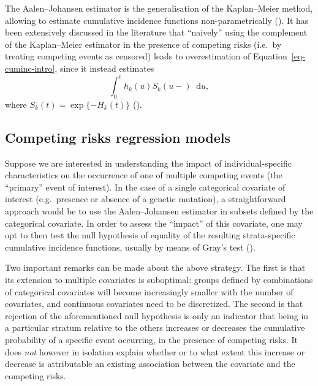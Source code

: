 \documentclass[
  letterpaper,
  paper=240mm:170mm,
  twoside=true,
  open=right,
  fontsize=10pt,
  pagesize=false,
  BCOR=15mm,
  DIV=14,
  headinclude=true,
  footinclude=false,
  headsepline=on]{scrbook}
\newcommand\diff{\mathop{}\!\mathrm{d}}
\begin{document}
The Aalen--Johansen estimator is the generalisation of the Kaplan--Meier
method, allowing to estimate cumulative incidence functions
non-parametrically
(). It has been extensively discussed in the literature that
``naively'' using the complement of the Kaplan--Meier estimator in the
presence of competing risks (i.e.~by treating competing events as
censored) leads to overestimation of Equation~\ref{eq-cuminc-intro},
since it instead estimates \[
\int_{0}^{t}h_k(u)S_k(u-)\diff u,
\] where \(S_k(t) = \exp\{-H_k(t)\}\)
().

\subsection{Competing risks regression
models}\label{competing-risks-regression-models}

Suppose we are interested in understanding the impact of
individual-specific characteristics on the occurrence of one of multiple
competing events (the ``primary'' event of interest). In the case of a
single categorical covariate of interest (e.g.~presence or absence of a
genetic mutation), a straightforward approach would be to use the
Aalen--Johansen estimator in subsets defined by the categorical
covariate. In order to assess the ``impact'' of this covariate, one may
opt to then test the null hypothesis of equality of the resulting
strata-specific cumulative incidence functions, usually by means of
Gray's test ().

Two important remarks can be made about the above strategy. The first is
that its extension to multiple covariates is suboptimal: groups defined
by combinations of categorical covariates will become increasingly
smaller with the number of covariates, and continuous covariates need to
be discretized. The second is that rejection of the aforementioned null
hypothesis is only an indicator that being in a particular stratum
relative to the others increases or decreases the cumulative probability
of a specific event occurring, in the presence of competing risks. It
does \emph{not} however in isolation explain whether or to what extent
this increase or decrease is attributable an existing association
between the covariate and the competing risks.
\end{document}
